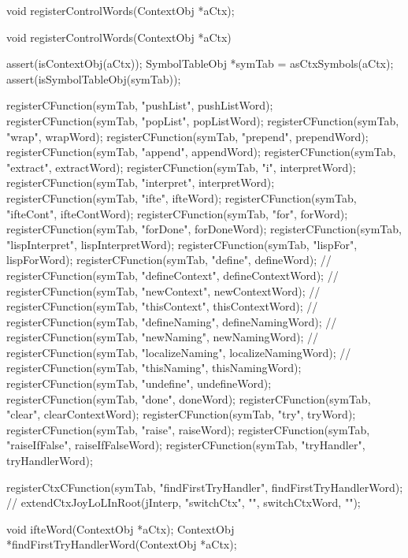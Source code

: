 \startTestSuite[registerControlWords]

\startCHeader
void registerControlWords(ContextObj *aCtx);
\stopCHeader

\startCCode
void registerControlWords(ContextObj *aCtx) {
  assert(isContextObj(aCtx));
  SymbolTableObj *symTab = asCtxSymbols(aCtx);
  assert(isSymbolTableObj(symTab));
 
  registerCFunction(symTab, "pushList",       pushListWord);
  registerCFunction(symTab, "popList",        popListWord);
  registerCFunction(symTab, "wrap",           wrapWord);
  registerCFunction(symTab, "prepend",        prependWord);
  registerCFunction(symTab, "append",         appendWord);
  registerCFunction(symTab, "extract",        extractWord);
  registerCFunction(symTab, "i",              interpretWord);
  registerCFunction(symTab, "interpret",      interpretWord);
  registerCFunction(symTab, "ifte",           ifteWord);
  registerCFunction(symTab, "ifteCont",       ifteContWord);
  registerCFunction(symTab, "for",            forWord);
  registerCFunction(symTab, "forDone",        forDoneWord);
  registerCFunction(symTab, "lispInterpret",  lispInterpretWord);
  registerCFunction(symTab, "lispFor",        lispForWord);
  registerCFunction(symTab, "define",         defineWord);
//  registerCFunction(symTab, "defineContext",  defineContextWord);
//  registerCFunction(symTab, "newContext",     newContextWord);
//  registerCFunction(symTab, "thisContext",    thisContextWord);
//  registerCFunction(symTab, "defineNaming",   defineNamingWord);
//  registerCFunction(symTab, "newNaming",      newNamingWord);
//  registerCFunction(symTab, "localizeNaming", localizeNamingWord);
//  registerCFunction(symTab, "thisNaming",     thisNamingWord);
  registerCFunction(symTab, "undefine",       undefineWord);
  registerCFunction(symTab, "done",           doneWord);
  registerCFunction(symTab, "clear",          clearContextWord);
  registerCFunction(symTab, "try",            tryWord);
  registerCFunction(symTab, "raise",          raiseWord);
  registerCFunction(symTab, "raiseIfFalse",   raiseIfFalseWord);
  registerCFunction(symTab, "tryHandler",     tryHandlerWord);
  
  registerCtxCFunction(symTab, "findFirstTryHandler", findFirstTryHandlerWord);
//  extendCtxJoyLoLInRoot(jInterp, "switchCtx",           "", switchCtxWord,           "");
}
\stopCCode


\startCHeader
void ifteWord(ContextObj *aCtx);
ContextObj *findFirstTryHandlerWord(ContextObj *aCtx);
\stopCHeader

